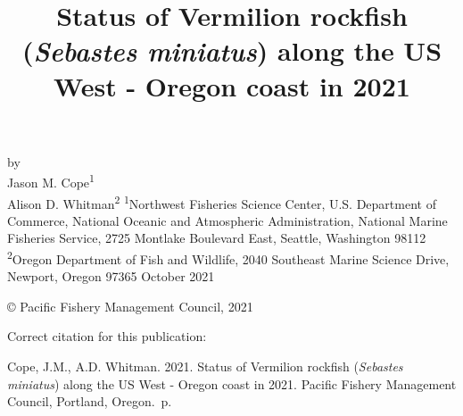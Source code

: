 \documentclass[11pt,
  english,
  a4paper,
]{article}
\date{}
\newcommand{\trTitle}{Status of Vermilion rockfish (\emph{Sebastes miniatus}) along the US West - Oregon coast in 2021}
\newcommand{\trYear}{2021}
\newcommand{\trMonth}{October}
\newcommand{\trAuthsBack}{Cope, J.M., A.D. Whitman}
\newcommand{\trCitation}{
\begin{hangparas}{1em}{1}
\trAuthsBack{}. \trYear{}. \trTitle{}. Pacific Fishery Management Council, Portland, Oregon. \pageref{LastPage}{}\,p.
\end{hangparas}}
\begin{document}

\renewcommand*{\thefootnote}{\fnsymbol{footnote}}

\small
\thispagestyle{empty}
\noindent
\begin{center}
\title{Status of Vermilion rockfish (\emph{Sebastes miniatus}) along the US West - Oregon coast in 2021}
\vspace{1.5cm}
{\Large\textbf{}}
\vfill
by\\
Jason M. Cope\textsuperscript{1}\\
Alison D. Whitman\textsuperscript{2}\vfill
\textsuperscript{1}Northwest Fisheries Science Center, U.S. Department of Commerce, National Oceanic and Atmospheric Administration, National Marine Fisheries Service, 2725 Montlake Boulevard East, Seattle, Washington 98112\\
\textsuperscript{2}Oregon Department of Fish and Wildlife, 2040 Southeast Marine Science Drive, Newport, Oregon 97365\vfill
\trMonth{} \trYear{}
\end{center}
\clearpage

\thispagestyle{empty}
\vspace*{\fill}
\begin{center}
\copyright{} Pacific Fishery Management Council, \trYear{}\\
\end{center}
\par
\bigskip
\noindent
Correct citation for this publication:
\bigskip
\par
\trCitation{}
\clearpage


\tableofcontents\clearpage
\label{TRlastRoman}
\clearpage

\newpage
\thispagestyle{empty} %

\pagestyle{plain}  %
\renewcommand*{\thefootnote}{\arabic{footnote}}  %
\setcounter{footnote}{0}  %
\renewcommand{\headrulewidth}{0.5pt}
\renewcommand{\footrulewidth}{0.5pt}
\end{document}
